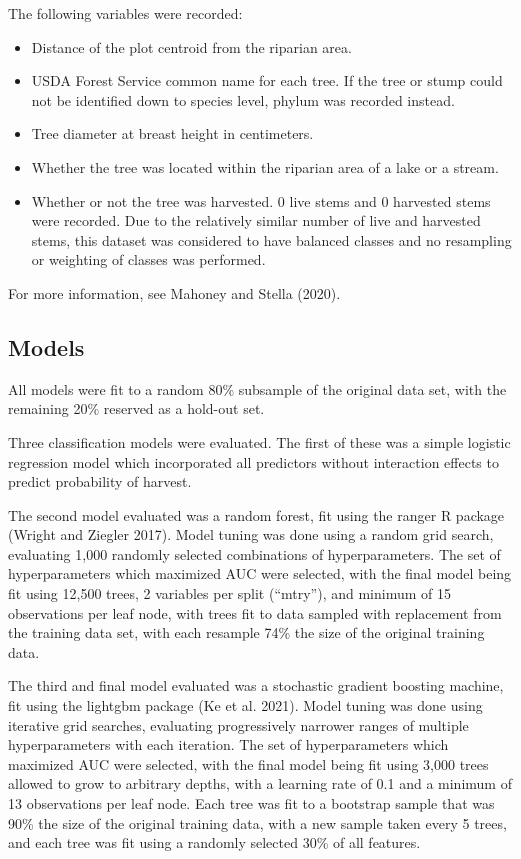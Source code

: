 \documentclass[]{elsarticle} %
\providecommand{\tightlist}{%
  \setlength{\itemsep}{0pt}\setlength{\parskip}{0pt}}
\begin{document}
The following variables were recorded:

\begin{itemize}
\tightlist
\item
  Distance of the plot centroid from the riparian area.
\item
  USDA Forest Service common name for each tree. If the tree
  or stump could not be identified down to species level, phylum was recorded
  instead.
\item
  Tree diameter at breast height in centimeters.
\item
  Whether the tree was located within the riparian area of a lake or a stream.
\item
  Whether or not the tree was harvested.
  0 live stems and
  0 harvested stems were recorded. Due to the relatively
  similar number of live and harvested stems, this dataset was considered to
  have balanced classes and no resampling or weighting of classes was performed.
\end{itemize}

For more information, see Mahoney and Stella (2020).

\hypertarget{models}{%
\subsection{Models}\label{models}}

All models were fit to a random 80\% subsample of the original data set, with the
remaining 20\% reserved as a hold-out set.

Three classification models were evaluated.
The first of these was a simple
logistic regression model which incorporated all predictors without interaction
effects to predict probability of harvest.

The second model evaluated was a random forest, fit using the ranger R package
(Wright and Ziegler 2017). Model tuning was done using a random grid search, evaluating 1,000
randomly selected combinations of hyperparameters. The set of hyperparameters
which maximized AUC were selected, with the final model being fit using 12,500
trees, 2 variables per split (``mtry''), and minimum of 15 observations per leaf
node, with trees fit to data sampled with replacement from the training data
set, with each resample 74\% the size of the original training data.

The third and final model evaluated was a stochastic gradient boosting machine,
fit using the lightgbm package (Ke et al. 2021). Model tuning was done using
iterative grid searches, evaluating progressively narrower ranges of multiple
hyperparameters with each iteration. The set of hyperparameters
which maximized AUC were selected, with the final model being fit using 3,000
trees allowed to grow to arbitrary depths, with a learning rate of 0.1 and a
minimum of 13 observations per leaf node. Each tree was fit to a bootstrap
sample that was 90\% the size of the original training data, with a new sample
taken every 5 trees, and each tree was fit using a randomly selected 30\% of
all features.
\end{document}
